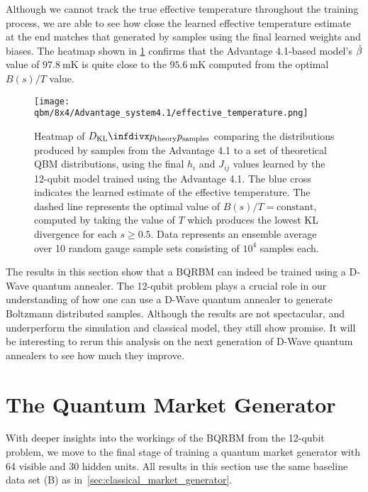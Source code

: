 Although we cannot track the true effective temperature throughout the training process, we are able to see how close the learned effective temperature estimate at the end matches that generated by samples using the final learned weights and biases.
The heatmap shown in \cref{fig:learned_effective_temperature} confirms that the Advantage 4.1-based model's \( \hat{\beta} \) value of \( 97.8 \ \si{\milli\kelvin} \) is quite close to the \( 95.6 \ \si{\milli\kelvin} \) computed from the optimal \( B(s) / T \) value.
\begin{figure}[!htb]
    \begin{center}
        \texttt{[image: qbm/8x4/Advantage\_system4.1/effective\_temperature.png]}
    \end{center}
    \caption{
        Heatmap of \( \DKL{\ptheory}{\psamples} \) comparing the distributions produced by samples from the Advantage 4.1 to a set of theoretical QBM distributions, using the final \( h_i \) and \( J_{ij} \) values learned by the 12-qubit model trained using the Advantage 4.1.
        The blue cross indicates the learned estimate of the effective temperature.
        The dashed line represents the optimal value of \( B(s) / T = \text{constant} \), computed by taking the value of \( T \) which produces the lowest KL divergence for each \( s \ge 0.5 \).
        Data represents an ensemble average over 10 random gauge sample sets consisting of \( 10^4 \) samples each.
    }
    \label{fig:learned_effective_temperature}
\end{figure}

The results in this section show that a BQRBM can indeed be trained using a D-Wave quantum annealer.
The 12-qubit problem plays a crucial role in our understanding of how one can use a D-Wave quantum annealer to generate Boltzmann distributed samples.
Although the results are not spectacular, and underperform the simulation and classical model, they still show promise.
It will be interesting to rerun this analysis on the next generation of D-Wave quantum annealers to see how much they improve.

\section{The Quantum Market Generator}\label{sec:quantum_market_generator}
With deeper insights into the workings of the BQRBM from the 12-qubit problem, we move to the final stage of training a quantum market generator with 64 visible and 30 hidden units.
All results in this section use the same baseline data set (B) as in~\cref{sec:classical_market_generator}.


